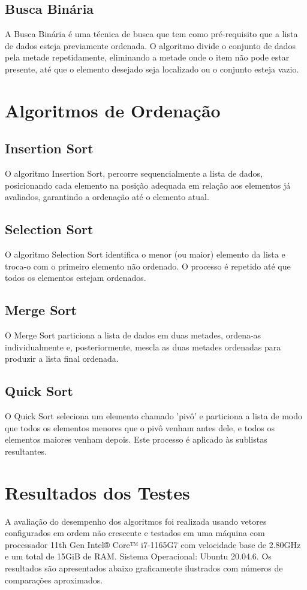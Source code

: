 \documentclass[conference]{IEEEtran}
\begin{document}
\subsection{Busca Binária}
A Busca Binária é uma técnica de busca que tem como pré-requisito que a lista de dados esteja previamente ordenada. O algoritmo divide o conjunto de dados pela metade repetidamente, eliminando a metade onde o item não pode estar presente, até que o elemento desejado seja localizado ou o conjunto esteja vazio.

\section{Algoritmos de Ordenação}
\subsection{Insertion Sort}
O algoritmo Insertion Sort, percorre sequencialmente a lista de dados, posicionando cada elemento na posição adequada em relação aos elementos já avaliados, garantindo a ordenação até o elemento atual.

\subsection{Selection Sort}
O algoritmo Selection Sort identifica o menor (ou maior) elemento da lista e troca-o com o primeiro elemento não ordenado. O processo é repetido até que todos os elementos estejam ordenados.

\subsection{Merge Sort}
O Merge Sort particiona a lista de dados em duas metades, ordena-as individualmente e, posteriormente, mescla as duas metades ordenadas para produzir a lista final ordenada.

\subsection{Quick Sort}
O Quick Sort seleciona um elemento chamado 'pivô' e particiona a lista de modo que todos os elementos menores que o pivô venham antes dele, e todos os elementos maiores venham depois. Este processo é aplicado às sublistas resultantes.

\section{Resultados dos Testes}
A avaliação do desempenho dos algoritmos foi realizada usando vetores configurados em ordem não crescente e testados em uma máquina com processador 11th Gen Intel® Core™ i7-1165G7 com velocidade base de 2.80GHz e um total de 15GiB de RAM. Sistema Operacional: Ubuntu 20.04.6. Os resultados são apresentados abaixo graficamente ilustrados com números de comparações aproximados.
\end{document}
